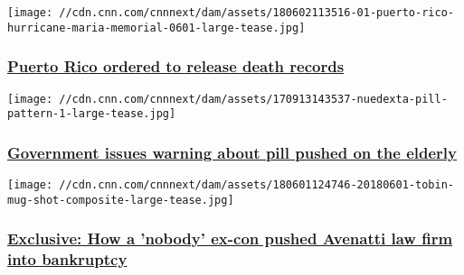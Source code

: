 \href{/2018/06/05/us/puerto-rico-hurricane-maria-death-records/index.html}{}

\texttt{[image: //cdn.cnn.com/cnnnext/dam/assets/180602113516-01-puerto-rico-hurricane-maria-memorial-0601-large-tease.jpg]}

\hypertarget{puerto-rico-ordered-to-release-death-records}{%
\subsubsection{\texorpdfstring{\href{/2018/06/05/us/puerto-rico-hurricane-maria-death-records/index.html}{Puerto
Rico ordered to release death
records}}{Puerto Rico ordered to release death records}}\label{puerto-rico-ordered-to-release-death-records}}

\href{/2018/06/04/health/nuedexta-government-warning-insurers-invs/index.html}{}

\texttt{[image: //cdn.cnn.com/cnnnext/dam/assets/170913143537-nuedexta-pill-pattern-1-large-tease.jpg]}

\hypertarget{government-issues-warning-about-pill-pushed-on-the-elderly-}{%
\subsubsection{\texorpdfstring{\href{/2018/06/04/health/nuedexta-government-warning-insurers-invs/index.html}{Government
issues warning about pill pushed on the elderly
}}{Government issues warning about pill pushed on the elderly }}\label{government-issues-warning-about-pill-pushed-on-the-elderly-}}

\href{/2018/06/01/politics/avenatti-bankruptcy-lawsuit-stormy/index.html}{}

\texttt{[image: //cdn.cnn.com/cnnnext/dam/assets/180601124746-20180601-tobin-mug-shot-composite-large-tease.jpg]}

\hypertarget{exclusive-how-a-nobody-ex-con-pushed-avenatti-law-firm-into-bankruptcy}{%
\subsubsection{\texorpdfstring{\href{/2018/06/01/politics/avenatti-bankruptcy-lawsuit-stormy/index.html}{Exclusive:
How a 'nobody' ex-con pushed Avenatti law firm into
bankruptcy}}{Exclusive: How a 'nobody' ex-con pushed Avenatti law firm into bankruptcy}}\label{exclusive-how-a-nobody-ex-con-pushed-avenatti-law-firm-into-bankruptcy}}

\href{/2018/06/01/us/felons-driving-for-uber-invs/index.html}{}

